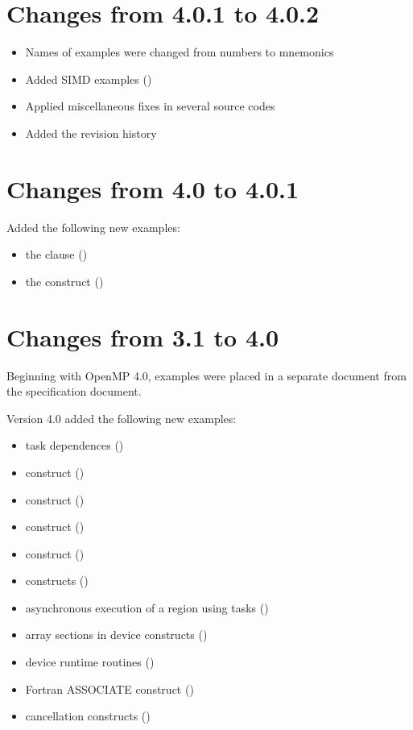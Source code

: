 \section{Changes from 4.0.1 to 4.0.2}

\begin{itemize}
\item Names of examples were changed from numbers to mnemonics
\item Added SIMD examples ()
\item Applied miscellaneous fixes in several source codes
\item Added the revision history
\end{itemize}

\section{Changes from 4.0 to 4.0.1}

Added the following new examples:
\begin{itemize}
\item the  clause ()
\item the  construct ()
\end{itemize}

\section{Changes from 3.1 to 4.0}

Beginning with OpenMP 4.0, examples were placed in a separate document
from the specification document.

Version 4.0 added the following new examples:
\begin{itemize}
\item task dependences ()
\item {} construct ()
\item {}  construct ()
\item {}  construct ()
\item {}  construct ()
\item {} constructs ()
\item asynchronous execution of a  region using tasks
 ()
\item array sections in device constructs ()
\item device runtime routines ()
\item Fortran ASSOCIATE construct ()
\item cancellation constructs ()
\end{itemize}
